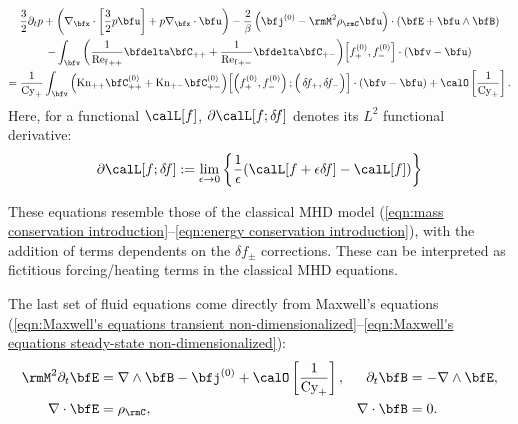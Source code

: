     \begin{multline}\label{eqn:PiC-coupled pressure conservation}
        \frac{3}{2}\partial_{t}p + \left(\nabla_{\bfx}\cdot\left[\frac{3}{2}p\bfu\right] + p\nabla_{\bfx}\cdot\bfu\right) - \frac{2}{\beta}\left(\bfj^{(0)} - \rmM^{2}\rho_{\rmC}\bfu\right)\cdot(\bfE + \bfu\wedge\bfB)  \\
        - \int_{\bfv}\left(\frac{1}{{\rmRef}_{++}}\bfdelta\bfC_{++} + \frac{1}{{\rmRef}_{+-}}\bfdelta\bfC_{+-}\right)\!\left[f_{+}^{(0)}, f_{-}^{(0)}\right]\cdot(\bfv - \bfu)  \\
        =  \frac{1}{\rmCy_{+}}\int_{\bfv}\left(\rmKn_{++}\bfC_{++}^{(0)} + \rmKn_{+-}\bfC_{+-}^{(0)}\right)\!\left[\left(f_{+}^{(0)}, f_{-}^{(0)}\right); \left({\color{white} f_{+}^{(0)}}\!\!\!\!\!\!\!\!\!\delta\!f_{+}, \delta\!f_{-}\right)\right]\cdot(\bfv - \bfu) + \calO\left[\frac{1}{\rmCy_{+}}\right].
    \end{multline}
    Here, for a functional $\calL[f]$, $\partial\calL[f; \delta\!f]$ denotes its $L^{2}$ functional derivative:
    \begin{equation}
        \partial\calL[f; \delta\!f]  :=  \lim_{\epsilon \rightarrow 0}\left\{\frac{1}{\epsilon}(\calL[f + \epsilon\delta\!f] - \calL[f])\right\}
    \end{equation}
    
    These equations resemble those of the classical MHD model (\ref{eqn:mass conservation introduction}--\ref{eqn:energy conservation introduction}), with the addition of terms dependents on the $\delta\!f_{\pm}$ corrections. These can be interpreted as fictitious forcing/heating terms in the classical MHD equations.

    The last set of fluid equations come directly from Maxwell's equations (\ref{eqn:Maxwell's equations transient non-dimensionalized}--\ref{eqn:Maxwell's equations steady-state non-dimensionalized}):
    \begin{align}
        \rmM^{2}\partial_{t}\bfE  &=  \nabla\wedge\bfB - \bfj^{(0)} + \calO\left[\frac{1}{\rmCy_{+}}\right],  &
        \partial_{t}\bfB          &=  - \nabla\wedge\bfE,  \label{eqn:PiC-coupled Maxwell's equations transient}  \\
        \nabla\cdot\bfE           &=  \rho_{\rmC},  &
        \nabla\cdot\bfB           &=  0.  \label{eqn:PiC-coupled Maxwell's equations steady-state}
    \end{align}

    \shortline

